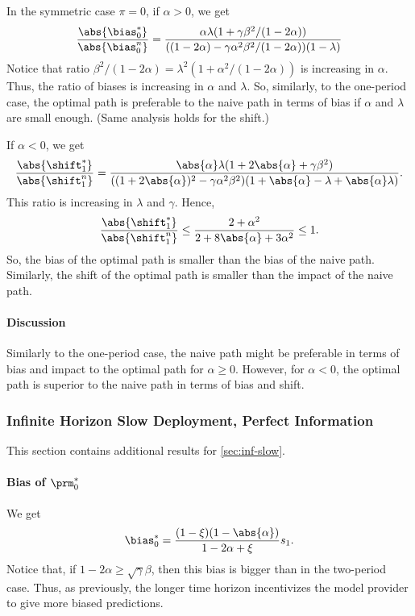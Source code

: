 In the symmetric case $\pi = 0$, if $\alpha > 0$, we get
\[
    \frac{\abs{\bias^*_0}}{\abs{\bias^n_0}} = \frac{\alpha \lambda (1 + \gamma
    \beta^2 / (1 - 2 \alpha))}{((1 - 2 \alpha) - \gamma \alpha^2 \beta^2 / (1 -
    2 \alpha)) (1 - \lambda)}
\]
Notice that ratio $\beta^2 / (1 - 2 \alpha) = \lambda^2 (1 + \alpha^2 / (1 - 2
\alpha))$ is increasing in $\alpha$. Thus, the ratio of biases is increasing in
$\alpha$ and $\lambda$. So, similarly, to the one-period case, the optimal path
is preferable to the naive path in terms of bias if $\alpha$ and $\lambda$ are
small enough. (Same analysis holds for the shift.)

If $\alpha < 0$, we get
\[
    \frac{\abs{\shift^*_1}}{\abs{\shift^n_1}} = \frac{\abs{\alpha} \lambda (1
    + 2 \abs{\alpha} + \gamma \beta^2)}{((1 + 2 \abs{\alpha})^2 - \gamma
    \alpha^2 \beta^2) (1 + \abs{\alpha} - \lambda + \abs{\alpha} \lambda)}.
\]
This ratio is increasing in $\lambda$ and $\gamma$. Hence,
\[
    \frac{\abs{\shift^*_1}}{\abs{\shift^n_1}} \le \frac{2 + \alpha^2}{2 + 8
    \abs{\alpha} + 3 \alpha^2} \le 1.
\]
So, the bias of the optimal path is smaller than the bias of the naive path.
Similarly, the shift of the optimal path is smaller than the impact of the
naive path.

\paragraph{Discussion}

Similarly to the one-period case, the naive path might be preferable in terms
of bias and impact to the optimal path for $\alpha \ge 0$. However, for $\alpha
< 0$, the optimal path is superior to the naive path in terms of bias and
shift.

\subsubsection{Infinite Horizon Slow Deployment, Perfect Information}

This section contains additional results for \cref{sec:inf-slow}.

\paragraph{Bias of $\prm^*_0$}

We get
\[
    \bias^*_0 = \frac{(1 - \xi) (1 - \abs{\alpha})}{1 - 2 \alpha +
    \xi} s_1.
\]
Notice that, if $1 - 2 \alpha \ge \sqrt{\gamma} \beta$, then this bias is
bigger than in the two-period case. Thus, as previously, the longer time
horizon incentivizes the model provider to give more biased predictions.

